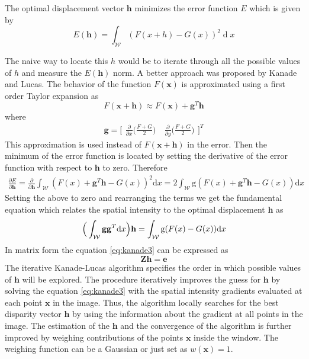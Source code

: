 \documentclass[11pt,a4paper,twoside]{report}
\begin{document}
The optimal displacement vector $\mathbf{h}$ minimizes the error function $E$ which is
given by
\begin{equation}
E(\mathbf{h}) = \int_{\mathcal{W}} (F(x + h) - G(x))^2 \mathop{d}x
\end{equation}

The naive way to locate this $h$  would be to iterate through all the possible values of $h$ and measure the $E(\mathbf{h})$ norm. A
better approach was proposed by Kanade and Lucas. The behavior
of the function $F(\mathbf{x})$ is approximated using a first order Taylor expansion as 
\begin{equation}\label{eq:kanade1}
F(\mathbf{x + h}) \approx F(\mathbf{x}) + \mathbf{g}^T\mathbf{h}
\end{equation}
where 
\begin{equation}
\mathbf{g} = \bigr[ \begin{smallmatrix} \frac{\partial}{\partial x}
    \bigr(\frac{F + G}{2}\bigl) \quad \frac{\partial}{\partial y} \bigr(\frac{F + G}{2}\bigl) \end{smallmatrix} \bigl]^T
\end{equation} 
This approximation is used instead of $F(\mathbf{x + h})$ in the error. Then the minimum of the error
function is located by setting the derivative of the error function with respect
to $\mathbf{h}$ to zero. Therefore
\begin{align}\label{eq:kanade2}
\frac{\partial E}{\partial \mathbf{h}} = \frac{\partial}{\partial \mathbf{h}}
\int_{\mathcal{W}} (F(x) + \mathbf{g}^T\mathbf{h} - G(x))^2 \mathrm{d}x =
2\int_{\mathcal{W}} \mathrm{g}(F(x) + \mathbf{g}^T\mathbf{h} - G(x))
\mathrm{d}x
\end{align}
Setting the above to zero and rearranging the terms we get the fundamental
equation which relates the spatial intensity to the optimal displacement
$\mathbf{h}$ as
\begin{align}\label{eq:kanade3}
\Bigr(\int_{\mathcal{W}} \mathbf{g}\mathbf{g}^T\mathrm{d}x\Bigl)\mathbf{h} = \int_{\mathcal{W}} \mathrm{g}(F(x) - G(x))
\mathrm{d}x
\end{align}
In matrix form the equation \ref{eq:kanade3} can be expressed as
\begin{equation}\label{eq:kanade4}
\mathbf{Z}\mathbf{h} = \mathbf{e}
\end{equation}
The iterative Kanade-Lucas algorithm specifies the order in which possible values of $\mathbf{h}$ will be explored. The procedure
iteratively improves the guess for $\mathbf{h}$ by solving the equation
\ref{eq:kanade3} with the spatial intensity
gradients evaluated at each point $\mathbf{x}$ in the image. Thus, the algorithm locally searches for the best disparity vector $\mathbf{h}$ by using the
information about the gradient at all points in the image. The estimation of the
$\mathbf{h}$ and the convergence of the algorithm is further improved by
weighing contributions of the points $\mathbf{x}$ inside the window. The
weighing function can be a Gaussian or just set as $w(\mathbf{x}) = 1$.
\end{document}
